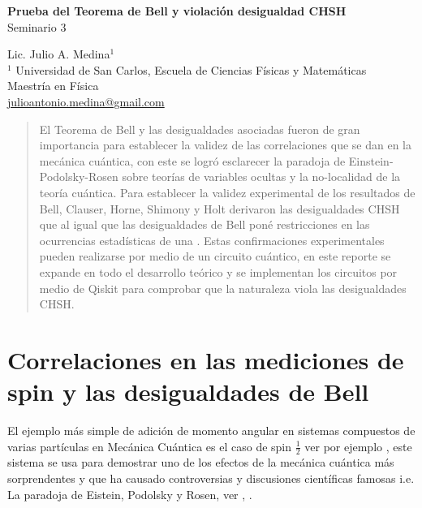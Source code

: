 \documentclass[a4paper]{article}
\begin{document}

\Large
 \begin{center}
\textbf{Prueba del Teorema de Bell y violación desigualdad CHSH}\\
Seminario 3  

\hspace{10pt}

\large
Lic. Julio A. Medina$^1$ \\

\hspace{10pt}
\small  
$^1$ Universidad de San Carlos, Escuela de Ciencias Físicas y Matemáticas\\
Maestría en Física\\
\href{mailto:julioantonio.medina@gmail.com}{julioantonio.medina@gmail.com}\\

\end{center}

\hspace{10pt}


\normalsize

\begin{abstract}
El Teorema de Bell y las desigualdades asociadas fueron de gran importancia para establecer la validez de las correlaciones que se dan en la mecánica cuántica, con este se logró esclarecer la paradoja de Einstein-Podolsky-Rosen sobre teorías de variables ocultas y la no-localidad de la teoría cuántica. Para establecer la validez experimental de los resultados de Bell, Clauser, Horne, Shimony y Holt derivaron las desigualdades CHSH que al igual que las desigualdades de Bell poné restricciones en las ocurrencias estadísticas de una . Estas confirmaciones experimentales pueden realizarse por medio de un circuito cuántico, en este reporte se expande en todo el desarrollo teórico y se implementan los circuitos por medio de Qiskit para comprobar que la naturaleza viola las desigualdades CHSH.
\end{abstract}

\section{Correlaciones en las mediciones de spin y las desigualdades de Bell}
El ejemplo más simple de adición de momento angular en sistemas compuestos de varias partículas en Mecánica Cuántica es el caso de spin $\frac{1}{2}$ ver por ejemplo \cite{Sakurai}, este sistema se usa para demostrar uno de los efectos de la mecánica cuántica más sorprendentes y que ha causado controversias y discusiones científicas famosas i.e. La paradoja de Eistein, Podolsky y Rosen, ver \cite{Einstein}, \cite{Bell}.\\
\end{document}

